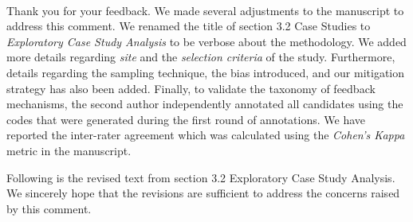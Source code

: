 \documentclass[11pt,fleqn]{article}
\newcommand{\eline}{\vspace*{.75\baselineskip}}
\newcommand{\Us}{\eline \noindent {\bf Response:}\\}
\begin{document}
\Us Thank you for your feedback. We made several adjustments to the manuscript to address this comment. We renamed the title of section 3.2 Case Studies to \emph{Exploratory Case Study Analysis} to be verbose about the methodology. We added more details regarding \emph{site} and the \emph{selection criteria} of the study. Furthermore, details regarding the sampling technique, the bias introduced, and our mitigation strategy has also been added. Finally, to validate the taxonomy of feedback mechanisms, the second author independently annotated all candidates using the codes that were generated during the first round of annotations. We have reported the inter-rater agreement which was calculated using the \emph{Cohen's Kappa} metric in the manuscript.

Following is the revised text from section 3.2 Exploratory Case Study Analysis. We sincerely hope that the revisions are sufficient to address the concerns raised by this comment.
\end{document}
